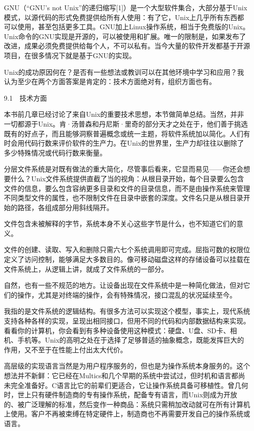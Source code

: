 \documentclass[a4paper,12pt,UTF8,twoside]{ctexbook}
\begin{document}
GNU（“GNU’s not Unix”的递归缩写[1]）是一个大型软件集合，大部分基于Unix模式，以源代码的形式免费提供给所有人使用：有了它，Unix上几乎所有东西都可以使用，甚至包括更多工具。GNU加上Linux操作系统，相当于免费版的Unix。Unix命令的GNU实现是开源的，可以被使用和扩展。唯一的限制是，如果发布了改进，成果必须免费提供给每个人，不可以私有。当今大量的软件开发都基于开源项目，在很多情况下就是基于GNU的实现。

Unix的成功原因何在？是否有一些想法或教训可以在其他环境中学习和应用？我认为至少在两个方面答案是肯定的：技术方面绝对有，组织方面也有。





9.1　技术方面


本书前几章已经讨论了来自Unix的重要技术思想，本节做简单总结。当然，并非一切都源于Unix。肯·汤普森和丹尼斯·里奇的部分天才之处在于，他们善于挑选既有的好点子，而且能够洞察普遍概念或统一主题，将软件系统加以简化。人们有时会用代码行数来评价软件的生产力。在Unix的世界里，生产力却往往以删除了多少特殊情况或代码行数来衡量。

分层文件系统是对既有做法的重大简化，尽管事后看来，它显而易见——你还会想要什么？Unix文件系统提供直截了当的视角：从根目录开始，每个目录要么包含文件的信息，要么包含容纳更多目录和文件的目录信息，而不是由操作系统来管理不同类型文件的属性，也不限制文件在目录中嵌套的深度。文件名只是从根目录开始的路径，各组成部分用斜线隔开。

文件包含未被解释的字节，系统本身不关心这些字节是什么，也不知道它们的意义。

文件的创建、读取、写入和删除只需六七个系统调用即可完成。屈指可数的权限位定义了访问控制，能够满足大多数目的。像可移动磁盘这样的存储设备可以挂载在文件系统上，从逻辑上讲，就成了文件系统的一部分。

自然，也有一些不规范的地方。让设备出现在文件系统中是一种简化做法，但对它们的操作，尤其是对终端的操作，会有特殊情况，接口混乱的状况延续至今。

我指的是文件系统的逻辑结构。有很多方法可以实现这个模型，事实上，现代系统支持各种各样的实现，呈现出相同接口，但用不同的代码和内部数据结构来实现。看看你的计算机，你会看到有多种设备使用这种模式：硬盘、U盘、SD卡、相机、手机等。Unix的高明之处在于选择了足够普适的抽象概念，既能发挥巨大的作用，又不至于在性能上付出太大代价。

高层级的实现语言当然是为用户程序服务的，但也是为操作系统本身服务的。这个想法并不新鲜：它已经在Multics和几个早期的系统中尝试过，但时机和语言都尚未完全准备好。C语言比它的前辈们更适合，它让操作系统具备可移植性。曾几何时，世上只有硬件制造商的专有操作系统，配备专有语言，而Unix则成为开放的、被广泛理解的标准，然后变作一种商品：系统只需稍加改动就可在所有计算机上使用。客户不再被束缚在特定硬件上，制造商也不再需要开发自己的操作系统或语言。
\end{document}
